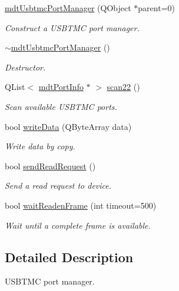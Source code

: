 \begin{DoxyCompactItemize}
\item 
\hyperlink{classmdt_usbtmc_port_manager_a99a24e4360e70ffc63677dbe888513f7}{mdtUsbtmcPortManager} (QObject $\ast$parent=0)
\begin{DoxyCompactList}\small\item\em Construct a USBTMC port manager. \end{DoxyCompactList}\item 
\hyperlink{classmdt_usbtmc_port_manager_aad6b2eef9b5cfb5c324affb6962a463b}{$\sim$mdtUsbtmcPortManager} ()
\begin{DoxyCompactList}\small\item\em Destructor. \end{DoxyCompactList}\item 
QList$<$ \hyperlink{classmdt_port_info}{mdtPortInfo} $\ast$ $>$ \hyperlink{classmdt_usbtmc_port_manager_a41d46a7104601f0259c772328c743b75}{scan22} ()
\begin{DoxyCompactList}\small\item\em Scan available USBTMC ports. \end{DoxyCompactList}\item 
bool \hyperlink{classmdt_usbtmc_port_manager_a7ff9a9ada7919af9a90286859695a29d}{writeData} (QByteArray data)
\begin{DoxyCompactList}\small\item\em Write data by copy. \end{DoxyCompactList}\item 
bool \hyperlink{classmdt_usbtmc_port_manager_a2da27dcbfc9448f1d61d93679b9a2ef3}{sendReadRequest} ()
\begin{DoxyCompactList}\small\item\em Send a read request to device. \end{DoxyCompactList}\item 
bool \hyperlink{classmdt_usbtmc_port_manager_a78ec9aec17061657f2151c677fc869eb}{waitReadenFrame} (int timeout=500)
\begin{DoxyCompactList}\small\item\em Wait until a complete frame is available. \end{DoxyCompactList}\end{DoxyCompactItemize}


\subsection{Detailed Description}
USBTMC port manager. 

